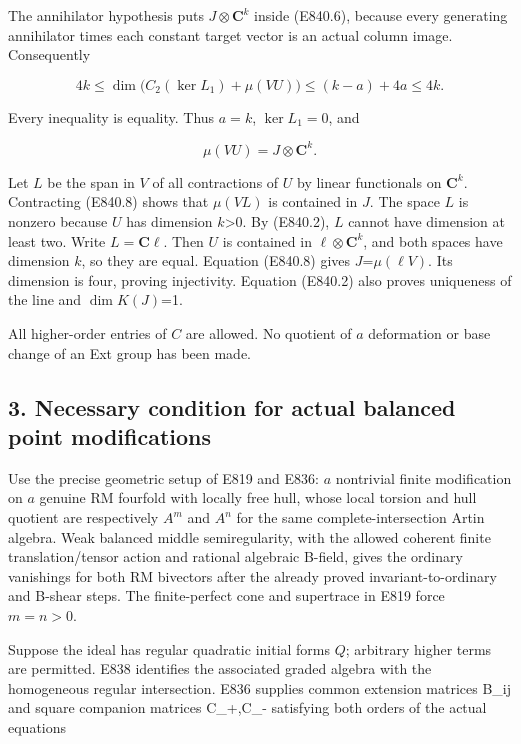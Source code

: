 The annihilator hypothesis puts \(J\otimes\mathbf C^k\) inside (E840.6),
because every generating annihilator times each constant target vector
is an actual column image. Consequently

\[
 4k\le\dim\bigl(C_2(\ker L_1)+\mu(VU)\bigr)
       \le(k-a)+4a\le4k.
 \tag{E840.7}
\]

Every inequality is equality. Thus \(a=k\), \(\ker L_1=0\), and

\[
                     \mu(VU)=J\otimes\mathbf C^k.
 \tag{E840.8}
\]

Let \(L\) be the span in \(V\) of all contractions of \(U\) by linear
functionals on \(\mathbf C^k\). Contracting (E840.8) shows that
\(\mu(VL)\) is contained in \(J\). The space \(L\) is nonzero because
\(U\) has dimension \(k\)\textgreater0. By (E840.2), \(L\) cannot have
dimension at least two. Write \(L=\mathbf C\ell\). Then \(U\) is
contained in \(\ell\otimes\mathbf C^k\), and both spaces have dimension
\(k\), so they are equal. Equation (E840.8) gives \(J\)=\(\mu(\ell V)\).
Its dimension is four, proving injectivity. Equation (E840.2) also
proves uniqueness of the line and \(\dim K(J)\)=1.

All higher-order entries of \(C\) are allowed. No quotient of \(a\)
deformation or base change of an Ext group has been made.

\subsection{3. Necessary condition for actual balanced point
modifications}\label{SF-E840:necessary-condition-for-actual-balanced-point-modifications}

Use the precise geometric setup of E819 and E836: \(a\) nontrivial
finite modification on \(a\) genuine RM fourfold with locally free hull,
whose local torsion and hull quotient are respectively \(A^m\) and
\(A^n\) for the same complete-intersection Artin algebra. Weak balanced
middle semiregularity, with the allowed coherent finite
translation/tensor action and rational algebraic B-field, gives the
ordinary vanishings for both RM bivectors after the already proved
invariant-to-ordinary and B-shear steps. The finite-perfect cone and
supertrace in E819 force \(m=n>0\).

Suppose the ideal has regular quadratic initial forms \(Q\); arbitrary
higher terms are permitted. E838 identifies the associated graded
algebra with the homogeneous regular intersection. E836 supplies common
extension matrices B\_ij and square companion matrices C\_+,C\_-
satisfying both orders of the actual equations

